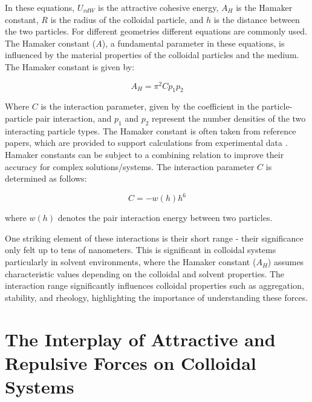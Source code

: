 

In these equations, \(U_{vdW}\) is the attractive cohesive energy, \(A_H\) is the Hamaker constant, \(R\) is the radius of the colloidal particle, and \(h\) is the distance between the two particles. For different geometries different equations are commonly used. The Hamaker constant (\(A\)), a fundamental parameter in these equations, is influenced by the material properties of the colloidal particles and the medium. The Hamaker constant is given by:

\begin{equation} %
A_H = \pi^2 C p_1 p_2
\end{equation}


Where \(C\) is the interaction parameter, given by the coefficient in the particle-particle pair interaction, and \(p_1\) and \(p_2\) represent the number densities of the two interacting particle types. The Hamaker constant is often taken from reference papers, which are provided to support calculations from experimental data \cite{Bergstrom1997}. Hamaker constants can be subject to a combining relation to improve their accuracy for complex solutions/systems. \cite{FoundColloidBook} The interaction parameter \(C\) is determined as follows:

\begin{equation}
C = -w(h) h^6
\end{equation}

where \(w(h)\) denotes the pair interaction energy between two particles. 

One striking element of these interactions is their short range - their significance only felt up to tens of nanometers. This is significant in colloidal systems particularly in solvent environments, where the Hamaker constant (\(A_H\)) assumes characteristic values depending on the colloidal and solvent properties. The interaction range significantly influences colloidal properties such as aggregation, stability, and rheology, highlighting the importance of understanding these forces.\cite{israelachvili2011intermolecular} %

\section{The Interplay of Attractive and Repulsive Forces on Colloidal Systems}

